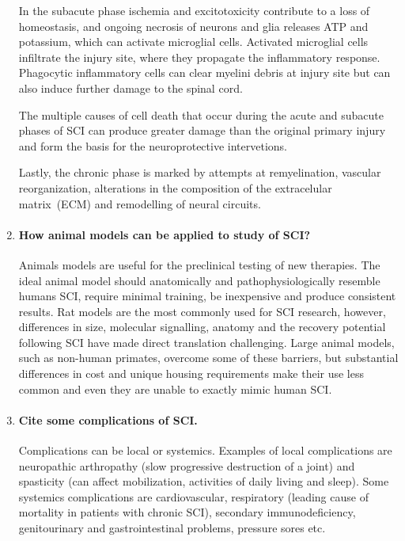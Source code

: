 \documentclass[12pt,article,oneside,a4paper]{memoir}
\begin{document}
\begin{enumerate}
In the subacute phase ischemia and excitotoxicity contribute to a loss of
homeostasis, and ongoing necrosis of neurons and glia releases ATP and
potassium, which can activate microglial cells. Activated microglial cells
infiltrate the injury site, where they propagate the inflammatory response.
Phagocytic inflammatory cells can clear myelini debris at injury site but can
also induce further damage to the spinal cord.

The multiple causes of cell death that occur during the acute and subacute
phases of SCI can produce greater damage than the original primary injury and
form the basis for the neuroprotective intervetions.

Lastly, the chronic phase is marked by attempts at remyelination, vascular
reorganization, alterations in the composition of the extracelular matrix~(ECM)
and remodelling of neural circuits.

\item \paragraph{How animal models can be applied to study of SCI?}
Animals models are useful for the preclinical testing of new therapies.
The ideal animal model should anatomically and pathophysiologically resemble
humans SCI, require minimal training, be inexpensive and produce consistent
results. Rat models are the most commonly used for SCI research, however,
differences in size, molecular signalling, anatomy and the recovery potential
following SCI have made direct translation challenging.
Large animal models, such as non-human primates, overcome some of these
barriers, but substantial differences in cost and unique housing requirements
make their use less common and even they are unable to exactly mimic human SCI.

\item \paragraph{Cite some complications of SCI.}
Complications can be local or systemics. Examples of local complications are
neuropathic arthropathy (slow progressive destruction of a joint) and
spasticity (can affect mobilization, activities of daily living and sleep).
Some systemics complications are cardiovascular, respiratory (leading cause of
mortality in patients with chronic SCI), secondary immunodeficiency,
genitourinary and gastrointestinal problems, pressure sores etc.

\end{enumerate}
\end{document}

